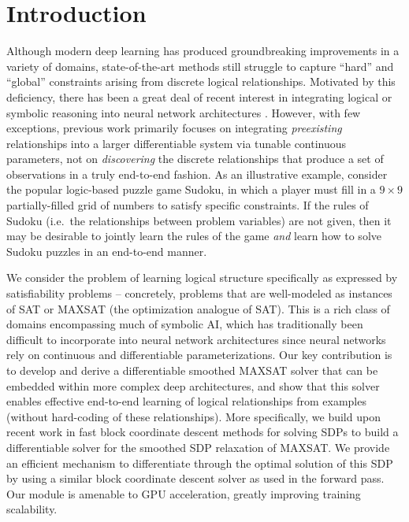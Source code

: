 \documentclass{article}
\begin{document}
	\section{Introduction}
	
	Although modern deep learning has produced groundbreaking improvements in a variety of domains, state-of-the-art methods still struggle to capture ``hard'' and ``global'' constraints arising from discrete logical relationships.  Motivated by this deficiency, there has been a great deal of recent interest in integrating logical or symbolic reasoning into neural network architectures \cite{palm2017recurrent, yang2017differentiable, cingillioglu2018deeplogic, evans2018learning}.  However, with few exceptions, previous work primarily focuses on integrating \emph{preexisting} relationships into a larger differentiable system via tunable continuous parameters, not on \emph{discovering} the discrete relationships that produce a set of observations in a truly end-to-end fashion.
    As an illustrative example, consider the popular logic-based puzzle game Sudoku, in which a player must fill in a $9 \times 9$ partially-filled grid of numbers to satisfy specific constraints. 
    If the rules of Sudoku (i.e.~the relationships between problem variables) are not given, then it may be desirable to jointly learn the rules of the game \emph{and} learn how to solve Sudoku puzzles in an end-to-end manner.

	We consider the problem of learning logical structure specifically as expressed by satisfiability problems -- concretely, problems that are well-modeled as instances of SAT or MAXSAT (the optimization analogue of SAT).  
	This is a rich class of domains encompassing much of symbolic AI, which has traditionally been difficult to incorporate into neural network architectures since neural networks rely on continuous and differentiable parameterizations.  
	Our key contribution is to develop and derive a differentiable smoothed MAXSAT solver that can be embedded within more complex deep architectures, and show that this solver enables effective end-to-end learning of
logical relationships from examples (without hard-coding of these relationships).
More specifically, we build upon recent work in fast block coordinate descent methods for solving SDPs \cite{wang2017mixing} to build a differentiable solver for the smoothed SDP relaxation of MAXSAT.
	We provide an efficient mechanism to differentiate through the optimal solution of this SDP by using a similar block coordinate descent solver as used in the forward pass.  
	Our module is amenable to GPU acceleration, greatly improving training scalability.  
\end{document}
